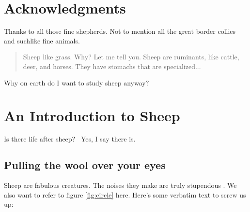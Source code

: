 \documentclass{umassthesis}          %
\begin{document}
\chapter{Acknowledgments}             %
  Thanks to all those fine shepherds. Not to mention all the great
  border collies and suchlike fine animals.

\begin{abstract}                %
  Sheep like grass.  Why?  Let me tell you.  Sheep are ruminants, like
  cattle, deer, and horses.  They have stomachs that are specialized...
\end{abstract}



\tableofcontents                %
\listoftables                   %
\listoffigures                  %


\mainmatter   %

Why on earth do I want to study sheep anyway?

\chapter{An Introduction to Sheep}
Is there life after sheep?~\cite{xyz}  Yes, I say there is.%

\section{Pulling the wool over your eyes}

Sheep are fabulous creatures.  The noises they make are truly stupendous
\cite{Bah}.  We also want to refer to figure \ref{fig:circle} here.
Here's some verbatim text to screw us up:
\end{document}
